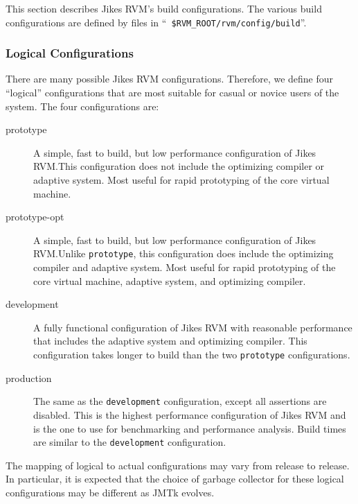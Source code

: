 This section describes Jikes\TMweb{} RVM's build configurations.
The various build configurations are defined by files in ``{\tt
\$RVM\-\_\-ROOT\-/\-rvm\-/\-con\-fig\-/\-build}''.

\subsubsection{Logical Configurations}%
\newcommand{\configName}[1]{\texttt{#1}}%

There are many possible Jikes RVM configurations.
Therefore, we define four ``logical'' configurations that are most
suitable for casual or novice users of the system.  The four
configurations are: 
\begin{description}

\item[prototype] A simple, fast to build, but low performance
configuration of Jikes RVM.\@  This configuration does not include the
optimizing compiler or adaptive system.  Most useful for rapid
prototyping of the core virtual machine.

\item[prototype-opt] A simple, fast to build, but low performance
configuration of Jikes RVM.\@  Unlike \configName{prototype}, this
configuration does include the optimizing compiler and adaptive system. Most useful for
rapid prototyping of the core virtual machine, adaptive system, and
optimizing compiler. 

\item[development] A fully functional configuration of
Jikes RVM with reasonable performance that includes the adaptive
system and optimizing compiler.  This configuration takes longer to
build than the two \configName{prototype} configurations.

\item[production] The same as the \configName{development} configuration,
except all assertions are disabled.  This is the highest performance
configuration of Jikes RVM and is the one to use for benchmarking and
performance analysis. Build times are similar to the \configName{development} 
configuration. 

\end{description}

The mapping of logical to actual configurations may vary from release
to release.  In particular, it is expected that the choice of garbage
collector for these logical configurations may be different as JMTk
evolves. 

